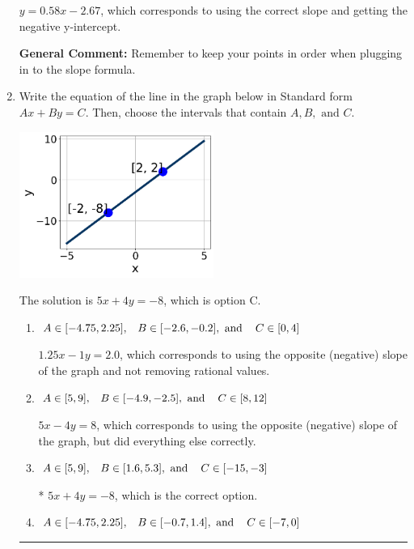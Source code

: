 \documentclass{extbook}[14pt]
\newcommand{\litem}[1]{\item #1

\rule{\textwidth}{0.4pt}}
\begin{document}
\begin{enumerate}
{\begin{enumerate}[label=\Alph*.]
 $y = 0.58x -2.67$, which corresponds to using the correct slope and getting the negative y-intercept.
\end{enumerate}

\textbf{General Comment:} Remember to keep your points in order when plugging in to the slope formula.
}
\litem{
Write the equation of the line in the graph below in Standard form $Ax+By=C$. Then, choose the intervals that contain $A, B, \text{ and } C$.

\begin{center}
    \includegraphics[width=0.5\textwidth]{../Figures/linearGraphToStandardC.png}
\end{center}


The solution is \( 5x + 4y = -8 \), which is option C.\begin{enumerate}[label=\Alph*.]
\item \( A \in [-4.75, 2.25], \hspace{3mm} B \in [-2.6, -0.2], \text{ and } \hspace{3mm} C \in [0, 4] \)

 $1.25x - 1y = 2.0$, which corresponds to using the opposite (negative) slope of the graph and not removing rational values.
\item \( A \in [5, 9], \hspace{3mm} B \in [-4.9, -2.5], \text{ and } \hspace{3mm} C \in [8, 12] \)

 $5x - 4y = 8$, which corresponds to using the opposite (negative) slope of the graph, but did everything else correctly.
\item \( A \in [5, 9], \hspace{3mm} B \in [1.6, 5.3], \text{ and } \hspace{3mm} C \in [-15, -3] \)

* $5x + 4y = -8$, which is the correct option.
\item \( A \in [-4.75, 2.25], \hspace{3mm} B \in [-0.7, 1.4], \text{ and } \hspace{3mm} C \in [-7, 0] \)


\end{enumerate}}
\end{enumerate}
\end{document}
